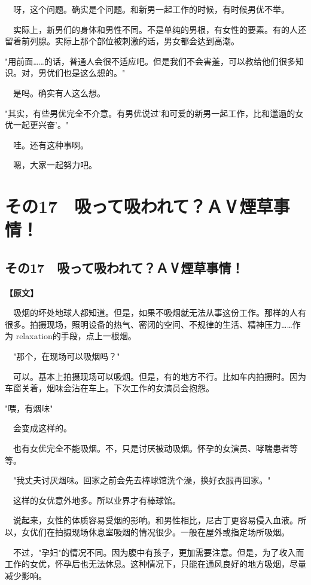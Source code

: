 \documentclass[12pt,UTF8]{ctexbook}
\begin{document}
{{　呀，这个问题。确实是个问题。和新男一起工作的时候，有时候男优不举。

　实际上，新男们的身体和男性不同。不是单纯的男根，有女性的要素。有的人还留着前列腺。实际上那个部位被刺激的话，男女都会达到高潮。

"用前面……的话，普通人会很不适应吧。但是我们不会害羞，可以教给他们很多知识。对，男优们也是这么想的。"

　是吗。确实有人这么想。

"其实，有些男优完全不介意。有男优说过'和可爱的新男一起工作，比和邋遢的女优一起更兴奋'。"

　哇。还有这种事啊。

　嗯，大家一起努力吧。
}

\chapter{その17　吸って吸われて？ＡⅤ煙草事情！}
\label{chap:17}
\section{その17　吸って吸われて？ＡⅤ煙草事情！}

\vspace{1ex}
\parbox{0.9\linewidth}{
\textbf{【原文】}\par

　吸烟的坏处地球人都知道。但是，如果不吸烟就无法从事这份工作。那样的人有很多。拍摄现场，照明设备的热气、密闭的空间、不规律的生活、精神压力……作为 relaxation的手段，点上一根烟。

　"那个，在现场可以吸烟吗？"

　可以。基本上拍摄现场可以吸烟。但是，有的地方不行。比如车内拍摄时。因为车窗关着，烟味会沾在车上。下次工作的女演员会抱怨。

"喂，有烟味"

　会变成这样的。

　也有女优完全不能吸烟。不，只是讨厌被动吸烟。怀孕的女演员、哮喘患者等等。

　"我丈夫讨厌烟味。回家之前会先去棒球馆洗个澡，换好衣服再回家。"

　这样的女优意外地多。所以业界才有棒球馆。

　说起来，女性的体质容易受烟的影响。和男性相比，尼古丁更容易侵入血液。所以，女优们在拍摄现场休息室吸烟的情况很少。一般在屋外或指定场所吸烟。

　不过，"孕妇"的情况不同。因为腹中有孩子，更加需要注意。但是，为了收入而工作的女优，怀孕后也无法休息。这种情况下，只能在通风良好的地方吸烟，尽量减少影响。

}}
\end{document}
